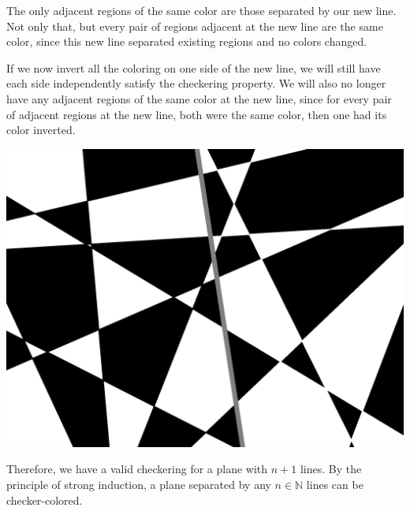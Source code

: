 \documentclass[12pt]{article}
\newcommand{\N}{\mathbb{N}}
\begin{document}
The only adjacent regions of the same color are those separated by our new line. Not only that, but every pair of regions adjacent at the new line are the same color, since this new line separated existing regions and no colors changed.

If we now invert all the coloring on one side of the new line, we will still have each side independently satisfy the checkering property. We will also no longer have any adjacent regions of the same color at the new line, since for every pair of adjacent regions at the new line, both were the same color, then one had its color inverted.
\begin{center}
    \includegraphics[scale=.09]{flipped.png}
\end{center}

Therefore, we have a valid checkering for a plane with $n+1$ lines. By the principle of strong induction, a plane separated by any $n\in\N$ lines can be checker-colored.
\end{document}
